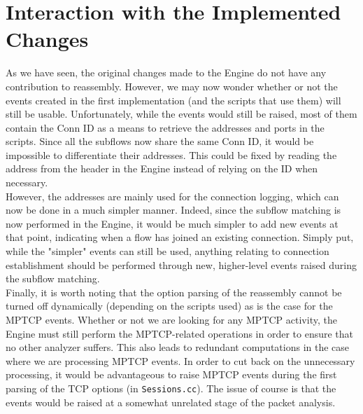 \section{Interaction with the Implemented Changes} \label{sec:interf}

As we have seen, the original changes made to the Engine do not have any contribution to reassembly. However, we may now wonder whether or not the events created in the first implementation (and the scripts that use them) will still be usable. Unfortunately, while the events would still be raised, most of them contain the Conn ID as a means to retrieve the addresses and ports in the scripts. Since all the subflows now share the same Conn ID, it would be impossible to differentiate their addresses. This could be fixed by reading the address from the header in the Engine instead of relying on the ID when necessary.\\

However, the addresses are mainly used for the connection logging, which can now be done in a much simpler manner. Indeed, since the subflow matching is now performed in the Engine, it would be much simpler to add new events at that point, indicating when a flow has joined an existing connection. Simply put, while the "simpler" events can still be used, anything relating to connection establishment should be performed through new, higher-level events raised during the subflow matching. \\

Finally, it is worth noting that the option parsing of the reassembly cannot be turned off dynamically (depending on the scripts used) as is the case for the MPTCP events. Whether or not we are looking for any MPTCP activity, the Engine must still perform the MPTCP-related operations in order to ensure that no other analyzer suffers. This also leads to redundant computations in the case where we are processing MPTCP events. In order to cut back on the unnecessary processing, it would be advantageous to raise MPTCP events during the first parsing of the TCP options (in \texttt{Sessions.cc}). The issue of course is that the events would be raised at a somewhat unrelated stage of the packet analysis.